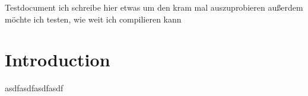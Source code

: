 \documentclass[11pt]{article}
\begin{document}
    Testdocument ich schreibe hier etwas um den kram mal auszuprobieren
    außerdem möchte ich testen, wie weit ich compilieren kann
    \newpage
    \newpage

    \section{Introduction}
    
    
    
    
    
    \begin{figure}
        \begin{center}
            
        \end{center}
    \end{figure}
    asdfasdfasdfasdf
\end{document}
